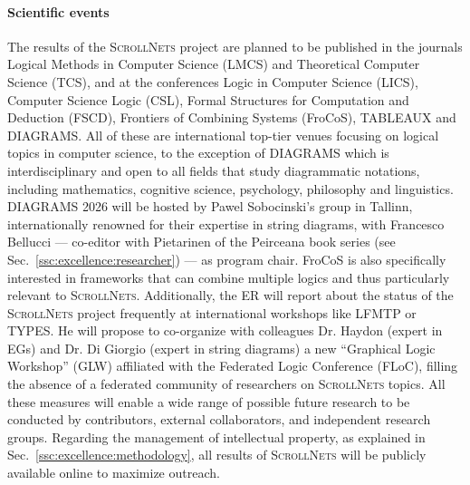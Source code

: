 \documentclass[12pt,draftproposal]{msca-pf}
\newcommand{\proj}{\small\textsc{ScrollNets}}
\begin{document}
\paragraph{Scientific events}
The results of the {\proj} project are planned to be published in the journals Logical Methods in
Computer Science (LMCS) and Theoretical Computer Science (TCS), and at the conferences Logic in
Computer Science (LICS), Computer Science Logic (CSL), Formal Structures for Computation and
Deduction (FSCD), Frontiers of Combining Systems (FroCoS), TABLEAUX and DIAGRAMS. All of these are
international top-tier venues focusing on logical topics in computer science, to the exception of
DIAGRAMS which is interdisciplinary and open to all fields that study diagrammatic notations,
including mathematics, cognitive science, psychology, philosophy and linguistics. DIAGRAMS 2026 will
be hosted by Pawel Sobocinski's group in Tallinn, internationally renowned for their expertise in
string diagrams, with Francesco Bellucci --- co-editor with Pietarinen of the Peirceana book series
(see Sec.~\ref{ssc:excellence:researcher}) --- as program chair. FroCoS is also specifically
interested in frameworks that can combine multiple logics and thus particularly relevant to {\proj}.
Additionally, the ER will report about the status of the {\proj} project frequently at international
workshops like LFMTP or TYPES. He will propose to co-organize with colleagues Dr. Haydon (expert in
EGs) and Dr. Di Giorgio (expert in string diagrams) a new ``Graphical Logic Workshop'' (GLW)
affiliated with the Federated Logic Conference (FLoC), filling the absence of a federated community
of researchers on {\proj} topics. All these measures will enable a wide range of possible future
research to be conducted by contributors, external collaborators, and independent research groups.
Regarding the management of intellectual property, as explained in
Sec.~\ref{ssc:excellence:methodology}, all results of {\proj} will be publicly available online to
maximize outreach.
\end{document}

